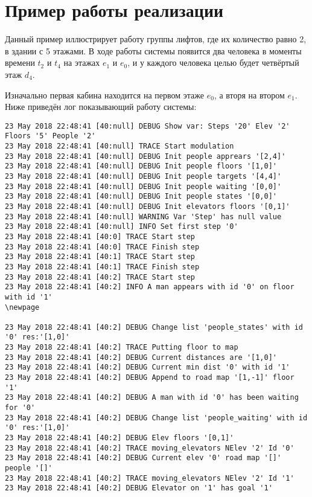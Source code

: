 \section{ Пример работы реализации}

	Данный пример иллюстрирует работу группы лифтов, где их количество равно 2, в здании с 5 этажами.
		В ходе работы системы появится два человека в моменты времени $t_2$ и $t_4$ на этажах $e_1$ и $e_0$,
		и у каждого человека целью будет четвёртый этаж $d_4$.

	Изначально первая кабина находится на первом этаже $e_0$, а вторя на втором $e_1$.
		Ниже приведён лог показывающий работу системы:
\begin{lstlisting}[basicstyle=\scriptsize]
23 May 2018 22:48:41 [40:null] DEBUG Show var: Steps '20' Elev '2' Floors '5' People '2'
23 May 2018 22:48:41 [40:null] TRACE Start modulation
23 May 2018 22:48:41 [40:null] DEBUG Init people apprears '[2,4]'
23 May 2018 22:48:41 [40:null] DEBUG Init people floors '[1,0]'
23 May 2018 22:48:41 [40:null] DEBUG Init people targets '[4,4]'
23 May 2018 22:48:41 [40:null] DEBUG Init people waiting '[0,0]'
23 May 2018 22:48:41 [40:null] DEBUG Init people states '[0,0]'
23 May 2018 22:48:41 [40:null] DEBUG Init elevators floors '[0,1]'
23 May 2018 22:48:41 [40:null] WARNING Var 'Step' has null value
23 May 2018 22:48:41 [40:null] INFO Set first step '0'
23 May 2018 22:48:41 [40:0] TRACE Start step
23 May 2018 22:48:41 [40:0] TRACE Finish step
23 May 2018 22:48:41 [40:1] TRACE Start step
23 May 2018 22:48:41 [40:1] TRACE Finish step
23 May 2018 22:48:41 [40:2] TRACE Start step
23 May 2018 22:48:41 [40:2] INFO A man appears with id '0' on floor with id '1'
\newpage

23 May 2018 22:48:41 [40:2] DEBUG Change list 'people_states' with id '0' res:'[1,0]'
23 May 2018 22:48:41 [40:2] TRACE Putting floor to map
23 May 2018 22:48:41 [40:2] DEBUG Current distances are '[1,0]'
23 May 2018 22:48:41 [40:2] DEBUG Current min dist '0' with id '1'
23 May 2018 22:48:41 [40:2] DEBUG Append to road map '[1,-1]' floor '1'
23 May 2018 22:48:41 [40:2] DEBUG A man with id '0' has been waiting for '0'
23 May 2018 22:48:41 [40:2] DEBUG Change list 'people_waiting' with id '0' res:'[1,0]'
23 May 2018 22:48:41 [40:2] DEBUG Elev floors '[0,1]'
23 May 2018 22:48:41 [40:2] TRACE moving_elevators NElev '2' Id '0'
23 May 2018 22:48:41 [40:2] DEBUG Current elev '0' road map '[]' people '[]'
23 May 2018 22:48:41 [40:2] TRACE moving_elevators NElev '2' Id '1'
23 May 2018 22:48:41 [40:2] DEBUG Elevator on '1' has goal '1'

\end{lstlisting}
